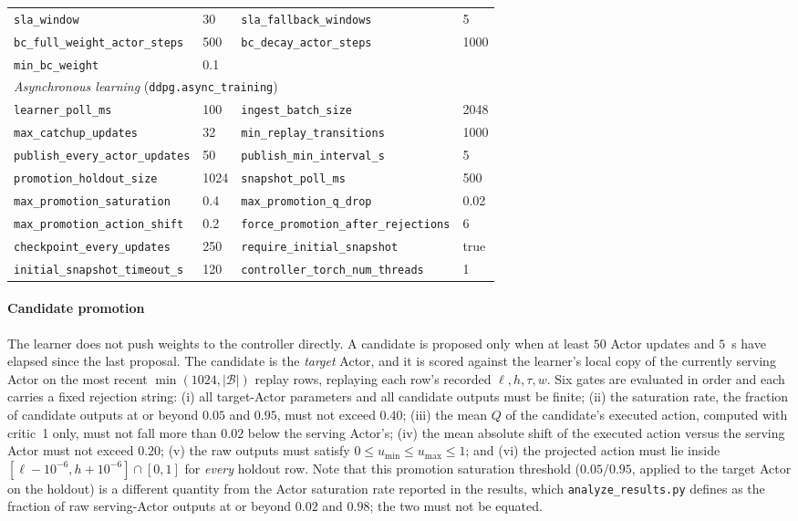 \begin{table}[t]
\begin{tabular}{llll}
\texttt{sla\_window} & 30 & \texttt{sla\_fallback\_windows} & 5\\
\texttt{bc\_full\_weight\_actor\_steps} & 500 & \texttt{bc\_decay\_actor\_steps} & 1000\\
\texttt{min\_bc\_weight} & 0.1 & & \\
\midrule
\multicolumn{4}{l}{\emph{Asynchronous learning} (\texttt{ddpg.async\_training})}\\
\texttt{learner\_poll\_ms} & 100 & \texttt{ingest\_batch\_size} & 2048\\
\texttt{max\_catchup\_updates} & 32 & \texttt{min\_replay\_transitions} & 1000\\
\texttt{publish\_every\_actor\_updates} & 50 & \texttt{publish\_min\_interval\_s} & 5\\
\texttt{promotion\_holdout\_size} & 1024 & \texttt{snapshot\_poll\_ms} & 500\\
\texttt{max\_promotion\_saturation} & 0.4 & \texttt{max\_promotion\_q\_drop} & 0.02\\
\texttt{max\_promotion\_action\_shift} & 0.2 & \texttt{force\_promotion\_after\_rejections} & 6\\
\texttt{checkpoint\_every\_updates} & 250 & \texttt{require\_initial\_snapshot} & true\\
\texttt{initial\_snapshot\_timeout\_s} & 120 & \texttt{controller\_torch\_num\_threads} & 1\\
\bottomrule
\end{tabular}
\end{table}

\paragraph*{Candidate promotion}
The learner does not push weights to the controller directly. A candidate is proposed only when at least $50$ Actor updates and $5$~s have elapsed since the last proposal. The candidate is the \emph{target} Actor, and it is scored against the learner's local copy of the currently serving Actor on the most recent $\min(1024,|\mathcal{B}|)$ replay rows, replaying each row's recorded $\ell,h,\tau,w$. Six gates are evaluated in order and each carries a fixed rejection string: (i) all target-Actor parameters and all candidate outputs must be finite; (ii) the saturation rate, the fraction of candidate outputs at or beyond $0.05$ and $0.95$, must not exceed $0.40$; (iii) the mean $Q$ of the candidate's executed action, computed with critic~1 only, must not fall more than $0.02$ below the serving Actor's; (iv) the mean absolute shift of the executed action versus the serving Actor must not exceed $0.20$; (v) the raw outputs must satisfy $0\leq u_{\min}\leq u_{\max}\leq1$; and (vi) the projected action must lie inside $[\ell-10^{-6},h+10^{-6}]\cap[0,1]$ for \emph{every} holdout row. Note that this promotion saturation threshold ($0.05/0.95$, applied to the target Actor on the holdout) is a different quantity from the Actor saturation rate reported in the results, which \texttt{analyze\_results.py} defines as the fraction of raw serving-Actor outputs at or beyond $0.02$ and $0.98$; the two must not be equated.

